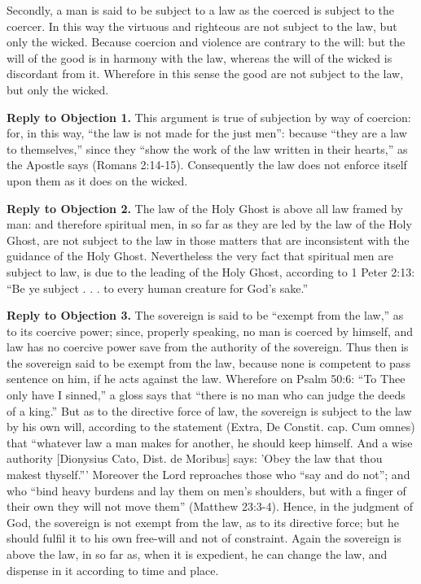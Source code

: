 Secondly, a man is said to be subject to a law as the coerced is subject to the coercer. In this way the virtuous and righteous are not subject to the law, but only the wicked. Because coercion and violence are contrary to the will: but the will of the good is in harmony with the law, whereas the will of the wicked is discordant from it. Wherefore in this sense the good are not subject to the law, but only the wicked.

\textbf{Reply to Objection 1.} This argument is true of subjection by way of coercion: for, in this way, ``the law is not made for the just men'': because ``they are a law to themselves,'' since they ``show the work of the law written in their hearts,'' as the Apostle says (Romans 2:14-15). Consequently the law does not enforce itself upon them as it does on the wicked.

\textbf{Reply to Objection 2.} The law of the Holy Ghost is above all law framed by man: and therefore spiritual men, in so far as they are led by the law of the Holy Ghost, are not subject to the law in those matters that are inconsistent with the guidance of the Holy Ghost. Nevertheless the very fact that spiritual men are subject to law, is due to the leading of the Holy Ghost, according to 1 Peter 2:13: ``Be ye subject . . . to every human creature for God's sake.''

\textbf{Reply to Objection 3.} The sovereign is said to be ``exempt from the law,'' as to its coercive power; since, properly speaking, no man is coerced by himself, and law has no coercive power save from the authority of the sovereign. Thus then is the sovereign said to be exempt from the law, because none is competent to pass sentence on him, if he acts against the law. Wherefore on Psalm 50:6: ``To Thee only have I sinned,'' a gloss says that ``there is no man who can judge the deeds of a king.'' But as to the directive force of law, the sovereign is subject to the law by his own will, according to the statement (Extra, De Constit. cap. Cum omnes) that ``whatever law a man makes for another, he should keep himself. And a wise authority [Dionysius Cato, Dist. de Moribus] says: 'Obey the law that thou makest thyself.''' Moreover the Lord reproaches those who ``say and do not''; and who ``bind heavy burdens and lay them on men's shoulders, but with a finger of their own they will not move them'' (Matthew 23:3-4). Hence, in the judgment of God, the sovereign is not exempt from the law, as to its directive force; but he should fulfil it to his own free-will and not of constraint. Again the sovereign is above the law, in so far as, when it is expedient, he can change the law, and dispense in it according to time and place.

